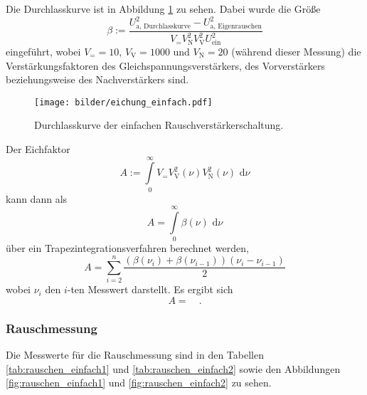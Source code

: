 		Die Durchlasskurve ist in Abbildung \ref{fig:eichung_einfach} zu sehen. Dabei wurde die Größe 
		\begin{equation}
		\beta := \frac{U^2_\text{a, Durchlasskurve}-U_\text{a, Eigenrauschen}^2}
		{V_= V_\text{N}^2 V_\text{V}^2  U^2_\text{ein}}
		\end{equation}
		eingeführt, wobei $V_= =10$, $V_\text{V}=1000$ und $V_\text{N}=20$ (während dieser Messung)
		die Verstärkungsfaktoren des Gleichspannungsverstärkers, des Vorverstärkers beziehungsweise 
		des Nachverstärkers sind.
		
		\begin{figure}
			\centering
			\texttt{[image: bilder/eichung\_einfach.pdf]}
			\caption{Durchlasskurve der einfachen Rauschverstärkerschaltung.}
			\label{fig:eichung_einfach}
		\end{figure}
		
		Der Eichfaktor 
		\begin{equation}
			A:=\int\limits_0^\infty V_= V_\text{V}^2(\nu) V_\text{N}^2(\nu) \text{ d}\nu		
		\end{equation}				
		kann dann als
		\begin{equation}
			A = \int \limits_0^\infty \beta(\nu) \text{ d}\nu
		\end{equation}
		über ein Trapezintegrationsverfahren berechnet werden,
		\begin{equation}
			A = \sum\limits_{i=2}^n \frac{\left(\beta(\nu_i)+
					\beta(\nu_{i-1})\right)(\nu_i-\nu_{i-1})}{2}
		\end{equation}
		wobei $\nu_i$ den $i$-ten Messwert darstellt. Es ergibt sich
		\begin{equation}
			A =     \quad . 
		\end{equation}


	
	\subsubsection{Rauschmessung}
		Die Messwerte für die Rauschmessung sind in den Tabellen \ref{tab:rauschen_einfach1} 
		und \ref{tab:rauschen_einfach2} sowie den Abbildungen 
		\ref{fig:rauschen_einfach1} und \ref{fig:rauschen_einfach2} zu sehen.
		
